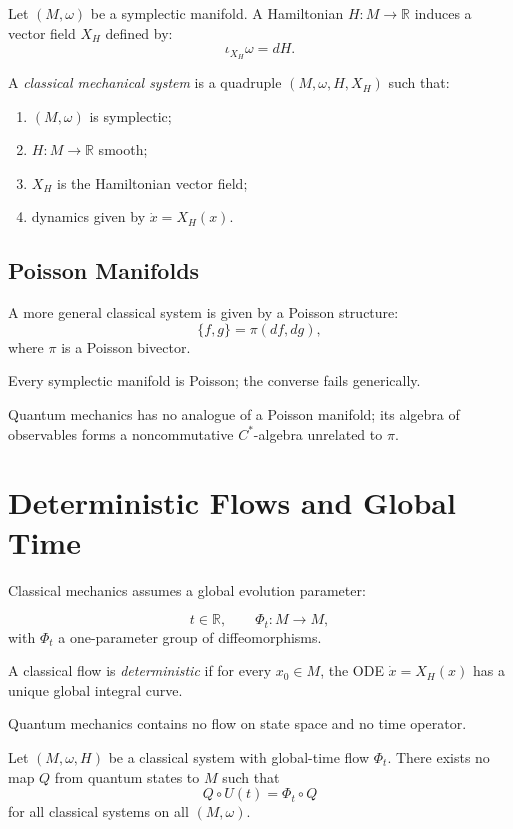 \documentclass[12pt,oneside]{book}
\begin{document}
Let $(M,\omega)$ be a symplectic manifold.  
A Hamiltonian $H:M\to\mathbb{R}$ induces a vector field $X_H$ defined by:
\[
\iota_{X_H}\omega = dH.
\]

\begin{definition}
A \emph{classical mechanical system} is a quadruple $(M,\omega,H,X_H)$ such that:
\begin{enumerate}
\item $(M,\omega)$ is symplectic;
\item $H:M\to\mathbb{R}$ smooth;
\item $X_H$ is the Hamiltonian vector field;
\item dynamics given by $\dot x = X_H(x)$.
\end{enumerate}
\end{definition}

\subsection{Poisson Manifolds}

A more general classical system is given by a Poisson structure:
\[
\{f,g\} = \pi(df,dg),
\]
where $\pi$ is a Poisson bivector.

\begin{theorem}
Every symplectic manifold is Poisson; the converse fails generically.
\end{theorem}

Quantum mechanics has no analogue of a Poisson manifold;
its algebra of observables forms a noncommutative $C^*$-algebra unrelated to $\pi$.

\section{Deterministic Flows and Global Time}

Classical mechanics assumes a global evolution parameter:

\[
t\in\mathbb{R},\qquad \Phi_t : M\to M,
\]
with $\Phi_t$ a one-parameter group of diffeomorphisms.

\begin{definition}
A classical flow is \emph{deterministic} if for every $x_0\in M$, the ODE
$\dot x = X_H(x)$ has a unique global integral curve.
\end{definition}

Quantum mechanics contains no flow on state space and no time operator.

\begin{theorem}
Let $(M,\omega,H)$ be a classical system with global-time flow $\Phi_t$.
There exists no map $Q$ from quantum states to $M$ such that
\[
Q\circ U(t) = \Phi_t \circ Q
\]
for all classical systems on all $(M,\omega)$.
\end{theorem}
\end{document}
